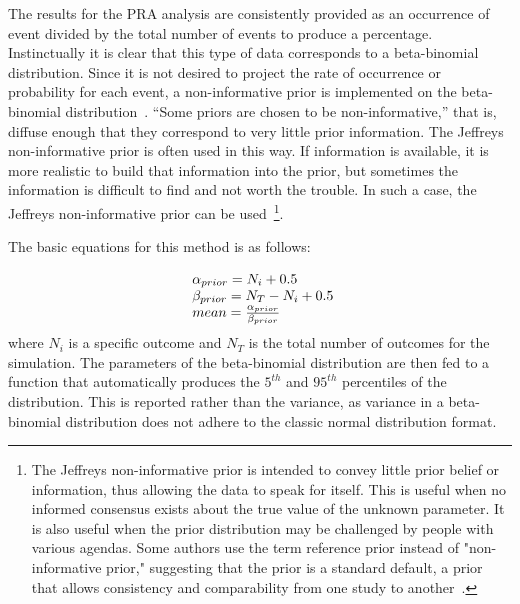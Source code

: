 The results for the PRA analysis are consistently provided as an occurrence of event 
divided by the total number of events to produce a percentage. Instinctually it is 
clear that this type of data corresponds to a beta-binomial distribution.  
Since it is not desired to project the rate of occurrence or probability for each event,
 a non-informative prior is implemented on the beta-binomial distribution~\cite{stat}.
``Some priors are chosen to be non-informative,'' that is, diffuse enough that they correspond 
to very little prior information. The Jeffreys non-informative prior is often used in this way. 
If information is available, it is more realistic to build that information into the prior, 
but sometimes the information is difficult to find and not worth the trouble. 
In such a case, the Jeffreys non-informative prior can be used~\cite{NUREGCR6823}\footnote{The Jeffreys 
non-informative prior is intended to convey little prior belief or information, 
thus allowing the data to speak for itself. This is useful when no informed consensus exists 
about the true value of the unknown parameter. It is also useful when the prior distribution 
may be challenged by people with various agendas. Some authors use the term reference prior 
instead of "non-informative prior," suggesting that the prior is a standard default, a prior 
that allows consistency and comparability from one study to another~\cite{NUREGCR6823}.}.

The basic equations for this method is as follows:

\begin{equation}
  \begin{array}{l@{}l}
    \alpha_{prior} = N_i + 0.5                     \\
    \beta_{prior} = N_T - N_i + 0.5                \\
    mean = \frac{\alpha_{prior}}{\beta_{prior}}
  \label{eq:priorDef}
  \end{array}
\end{equation}
where $N_i$ is a specific outcome and $N_T$ is the total number of outcomes for the simulation. 
The parameters of the beta-binomial distribution are then fed to a function that automatically 
produces the $5^{th}$ and $95^{th}$ percentiles of the distribution.  This is reported rather than the 
variance, as variance in a beta-binomial distribution does not adhere to the classic normal 
distribution format.


